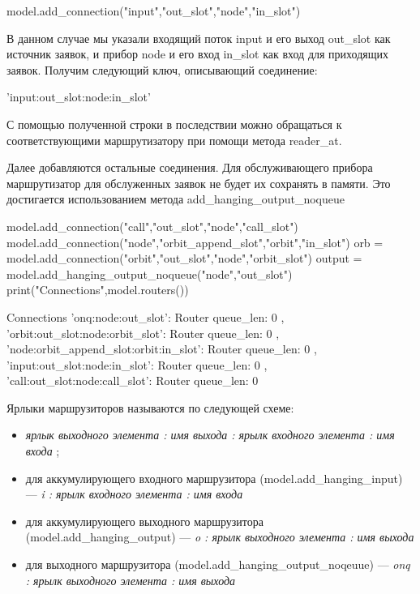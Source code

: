 \begin{pyin}
	model.add_connection("input","out_slot","node","in_slot")
\end{pyin}
В данном случае мы указали входящий поток input и его выход out\_slot как источник заявок, и прибор node и его вход in\_slot как вход для приходящих заявок. Получим следующий ключ, описывающий соединение:
\begin{pyout}
'input:out_slot:node:in_slot'
\end{pyout}
С помощью полученной строки в последствии можно обращаться к соответствующими маршрутизатору при помощи метода reader\_at.

Далее добавляются остальные соединения. Для обслуживающего прибора маршрутизатор для обслуженных заявок не будет их сохранять в памяти. Это достигается использованием метода add\_hanging\_output\_noqueue
\begin{pyin}
model.add_connection("call","out_slot","node","call_slot")
model.add_connection("node","orbit_append_slot","orbit","in_slot")
orb = model.add_connection("orbit","out_slot","node","orbit_slot")
output = model.add_hanging_output_noqueue("node","out_slot")
print("Connections",model.routers())
\end{pyin}

\begin{pyout}
Connections {
'onq:node:out_slot': Router{ queue_len: 0 },
'orbit:out_slot:node:orbit_slot': Router{ queue_len: 0 },
'node:orbit_append_slot:orbit:in_slot': Router{ queue_len: 0 },
'input:out_slot:node:in_slot': Router{ queue_len: 0 },
'call:out_slot:node:call_slot': Router{ queue_len: 0 }
}
\end{pyout}

Ярлыки маршрузиторов называются по следующей схеме:
\begin{itemize}
	\item \textit{ ярлык выходного элемента :  имя выхода :  ярылк входного элемента : имя входа };
	\item для аккумулирующего входного маршрузитора (model.add\_hanging\_input) --- \textit{i :  ярылк входного элемента : имя входа}
	\item для аккумулирующего выходного маршрузитора (model.add\_hanging\_output) --- \textit{o :  ярылк выходного элемента : имя выхода}
	\item для выходного маршрузитора (model.add\_hanging\_output\_noqeuue) --- \textit{onq :  ярылк выходного элемента : имя выхода}
\end{itemize}

